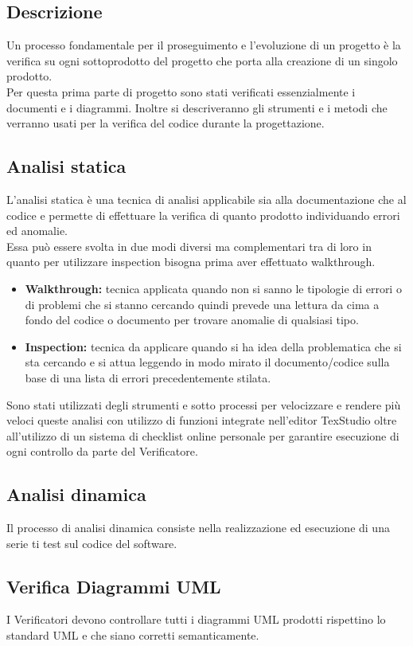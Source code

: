 \documentclass[NormeDiProgetto.tex]{subfiles}
\begin{document}
	\subsection{Descrizione}
	Un processo fondamentale per il proseguimento e l'evoluzione di un progetto è la verifica su ogni sottoprodotto del progetto che porta alla creazione di un singolo prodotto.\\
	Per questa prima parte di progetto sono stati verificati essenzialmente i documenti e i diagrammi. Inoltre si descriveranno gli strumenti e i metodi che verranno usati per la verifica del codice durante la progettazione.
	
	\subsection{Analisi statica}
	L'analisi statica è una tecnica di analisi applicabile sia alla documentazione che al codice e permette di effettuare la verifica di quanto prodotto individuando errori ed anomalie.\\
	Essa può essere svolta in due modi diversi ma complementari tra di loro in quanto per utilizzare inspection bisogna prima aver effettuato walkthrough.
		\begin{itemize}
			\item \textbf{Walkthrough:} tecnica applicata quando non si sanno le tipologie di errori o di problemi che si stanno cercando quindi prevede una lettura da cima a fondo del codice o documento per trovare anomalie di qualsiasi tipo.			
			\item \textbf{Inspection:} tecnica da applicare quando si ha idea della problematica che si sta cercando e si attua leggendo in modo mirato il documento/codice sulla base di una lista di errori precedentemente stilata.
		\end{itemize}
	Sono stati utilizzati degli strumenti e sotto processi per velocizzare e rendere più veloci queste analisi con utilizzo di funzioni integrate nell'editor TexStudio oltre all'utilizzo di un sistema di checklist online personale per garantire esecuzione di ogni controllo da parte del Verificatore.
	
	\subsection{Analisi dinamica}
	Il processo di analisi dinamica consiste nella realizzazione ed esecuzione di una serie ti test sul codice del software. 
	
	
	\subsection{Verifica Diagrammi UML}
	I Verificatori devono controllare tutti i diagrammi UML prodotti rispettino lo standard UML e che siano corretti semanticamente.
	
\end{document}
